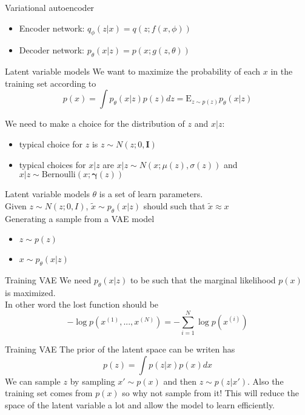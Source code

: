 \documentclass{beamer}
\newcommand{\bernoulli}{\mathrm{Bernoulli}}
\newcommand{\E}{\mathrm{E}}
\begin{document}
\begin{frame}{Variational autoencoder}
\begin{itemize}
	\item Encoder network: $q_\phi(z|x)=q(z;f(x,\phi))$
	\item Decoder network: $p_\theta(x|z)=p(x;g(z,\theta))$
\end{itemize}
\end{frame}

\begin{frame}{Latent variable models}
We want to maximize the probability of each $x$ in the training set according to
\[
	p(x) = \int p_\theta (x|z) p(z) dz = \E_{z\sim p(z)} p_\theta(x|z)
\]

We need to make a choice for the distribution of $z$ and $x|z$: 
\begin{itemize}
	\item typical choice for $z$ is $z\sim N(z;0, \bm{I})$
	\item typical choices for $x|z$ are $x|z\sim N(x;\mu(z), \sigma(z))$ and $x|z\sim \bernoulli(x;\bm{\gamma}(z))$
\end{itemize}
\end{frame}

\begin{frame}{Latent variable models}
$\theta$ is a set of learn parameters. \\

Given $z\sim N(z;0,I)$, $\tilde{x}\sim p_\theta(x|z)$ should such that $\tilde{x}\approx x$\\

Generating a sample from a VAE model
\begin{itemize}
	\item $z\sim p(z)$
	\item $x\sim p_\theta(x|z)$
	\end{itemize}
\end{frame}

\begin{frame}{Training VAE}
We need $p_\theta(x|z)$ to be such that the marginal likelihood $p(x)$ is maximized. \\

In other word the lost function should be
\[
	-\log p(x^{(1)},...,x^{(N)}) = -\sum_{i=1}^N \log p(x^{(i)})
\]
\end{frame}

\begin{frame}{Training VAE}
The prior of the latent space can be writen has
\[
	p(z) = \int p(z|x) p(x) dx
\]
We can sample $z$ by sampling $x'\sim p(x)$ and then $z\sim p(z|x')$. Also the training set comes from $p(x)$ so why not sample from it! This will reduce the space of the latent variable a lot and allow the model to learn efficiently.
\end{frame}
\end{document}
